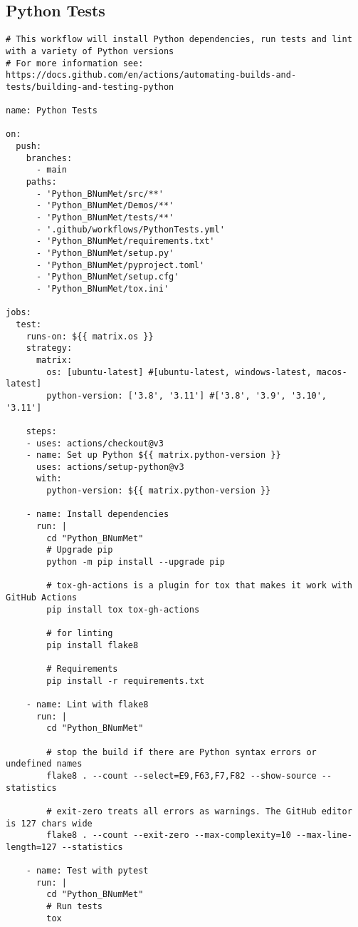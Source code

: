 \subsection*{Python Tests}
\begin{lstlisting}
# This workflow will install Python dependencies, run tests and lint with a variety of Python versions
# For more information see: https://docs.github.com/en/actions/automating-builds-and-tests/building-and-testing-python

name: Python Tests

on:
  push:
    branches:
      - main
    paths:
      - 'Python_BNumMet/src/**'
      - 'Python_BNumMet/Demos/**'
      - 'Python_BNumMet/tests/**'
      - '.github/workflows/PythonTests.yml'
      - 'Python_BNumMet/requirements.txt'
      - 'Python_BNumMet/setup.py'
      - 'Python_BNumMet/pyproject.toml'
      - 'Python_BNumMet/setup.cfg'
      - 'Python_BNumMet/tox.ini'

jobs:
  test:
    runs-on: ${{ matrix.os }}
    strategy:
      matrix:
        os: [ubuntu-latest] #[ubuntu-latest, windows-latest, macos-latest]
        python-version: ['3.8', '3.11'] #['3.8', '3.9', '3.10', '3.11']

    steps:
    - uses: actions/checkout@v3
    - name: Set up Python ${{ matrix.python-version }}
      uses: actions/setup-python@v3
      with:
        python-version: ${{ matrix.python-version }}

    - name: Install dependencies
      run: |
        cd "Python_BNumMet"
        # Upgrade pip
        python -m pip install --upgrade pip 

        # tox-gh-actions is a plugin for tox that makes it work with GitHub Actions
        pip install tox tox-gh-actions 

        # for linting
        pip install flake8 

        # Requirements
        pip install -r requirements.txt

    - name: Lint with flake8
      run: |
        cd "Python_BNumMet"

        # stop the build if there are Python syntax errors or undefined names
        flake8 . --count --select=E9,F63,F7,F82 --show-source --statistics

        # exit-zero treats all errors as warnings. The GitHub editor is 127 chars wide
        flake8 . --count --exit-zero --max-complexity=10 --max-line-length=127 --statistics

    - name: Test with pytest
      run: |
        cd "Python_BNumMet"
        # Run tests
        tox
\end{lstlisting}


